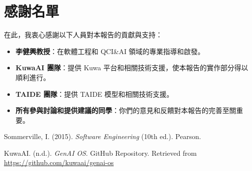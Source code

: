 \documentclass[twocolumn,11pt,a4paper]{article}
\begin{document}
\section*{感謝名單}
在此，我衷心感謝以下人員對本報告的貢獻與支持：
\begin{itemize}[noitemsep, topsep=0pt]
    \item \textbf{李健興教授}：在軟體工程和 QCI\&AI 領域的專業指導和啟發。
    \item \textbf{KuwaAI 團隊}：提供 Kuwa 平台和相關技術支援，使本報告的實作部分得以順利進行。
    \item \textbf{TAIDE 團隊}：提供 TAIDE 模型和相關技術支援。
    \item \textbf{所有參與討論和提供建議的同學}：你們的意見和反饋對本報告的完善至關重要。
\end{itemize}


\begin{thebibliography}{9}

Sommerville, I. (2015). \textit{Software Engineering} (10th ed.). Pearson.

KuwaAI. (n.d.). \textit{GenAI OS}. GitHub Repository. Retrieved from \url{https://github.com/kuwaai/genai-os}

\end{thebibliography}
\end{document}
